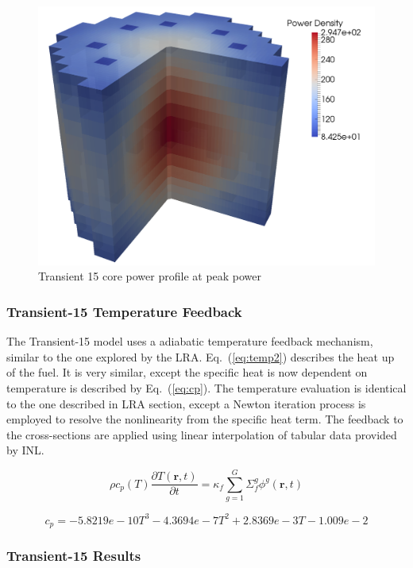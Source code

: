 \documentclass{anstrans}
\renewcommand{\vec}[1]{\bm{#1}} %
\newcommand{\eqt}[1]{Eq.~(\ref{#1})}                     %
\newcommand{\be}{\begin{equation}}
\newcommand{\ee}{\end{equation}}
\begin{document}
\begin{figure}[htbp!]
\centering
\includegraphics[width=\linewidth]{Tran15_core2.png}
\caption{Transient 15 core power profile at peak power}
\label{fig:Tran15}
\end{figure}


\subsubsection{Transient-15 Temperature Feedback}

The Transient-15 model uses a adiabatic temperature feedback mechanism, similar to the one explored by the LRA. \eqt{eq:temp2} describes the heat up of the fuel.  It is very similar, except the specific heat is now dependent on temperature is described by \eqt{eq:cp}.  The temperature evaluation is identical to the one described in LRA section, except a Newton iteration process is employed to resolve the nonlinearity from the specific heat term.  The feedback to the cross-sections are applied using linear interpolation of tabular data provided by INL.

\be
\rho c_p(T) \frac{\partial T(\vec{r},t)}{\partial t} = \kappa_f \sum^G_{g=1}\Sigma_f^g \phi^g(\vec{r},t)
\label{eq:temp2}
\ee

\be
c_p = -5.8219e-10T^3 - 4.3694e-7T^2 + 2.8369e-3T -1.009e-2
\label{eq:cp}
\ee

\subsubsection{Transient-15 Results}
\end{document}
